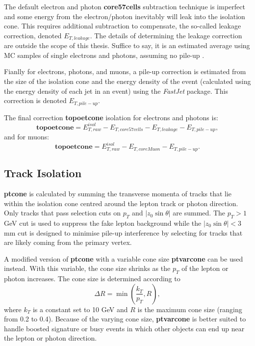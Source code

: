 The default electron and photon \textbf{core57cells} subtraction technique is imperfect and some energy from the electron/photon inevitably will leak into the isolation cone. This requires additional subtraction to compensate, the so-called leakage correction, denoted $E_{T, leakage}$. The details of determining the leakage correction are outside the scope of this thesis. Suffice to say, it is an estimated average using MC samples of single electrons and photons, assuming no pile-up \cite{laplace}.

Fianlly for electrons, photons, and muons, a pile-up correction is estimated from the size of the isolation cone and the energy density of the event (calculated using the energy density of each jet in an event) using the \emph{FastJet} \cite{laplace_22} package. This correction is denoted $E_{T, pile-up}$.

The final correction \textbf{topoetcone} isolation for electrons and photons is:
\begin{equation}
\mathbf{topoetcone} = E_{T, raw}^{isol} - E_{T, core57cells} - E_{T, leakage} - E_{T, pile-up},
\end{equation}
and for muons:
\begin{equation}
\mathbf{topoetcone} = E_{T, raw}^{isol} - E_{T, coreMuon} - E_{T, pile-up}.
\end{equation}
\subsection{Track Isolation}
\textbf{ptcone} is calculated by summing the transverse momenta of tracks that lie within the isolation cone centred around the lepton track or photon direction. Only tracks that pass selection cuts on $p_{T}$ and $| z_{0} \sin\theta |$ are summed. The $p_{T} > 1$ GeV cut is used to suppress the fake lepton background while the $| z_{0} \sin \theta | < 3$ mm cut is designed to minimise pile-up interference by selecting for tracks that are likely coming from the primary vertex.

A modified version of \textbf{ptcone} with a variable cone size \textbf{ptvarcone} can be used instead. With this variable, the cone size shrinks as the $p_{T}$ of the lepton or photon increases. The cone size is determined according to 
\begin{equation}
\Delta R = \min \left( \frac{k_{T}}{p_{T}},R \right),
\end{equation}
where $k_{T}$ is a constant set to 10 GeV and $R$ is the maximum cone size (ranging from 0.2 to 0.4). Because of the varying cone size, \textbf{ptvarcone} is better suited to handle boosted signature or busy events in which other objects can end up near the lepton or photon direction.

